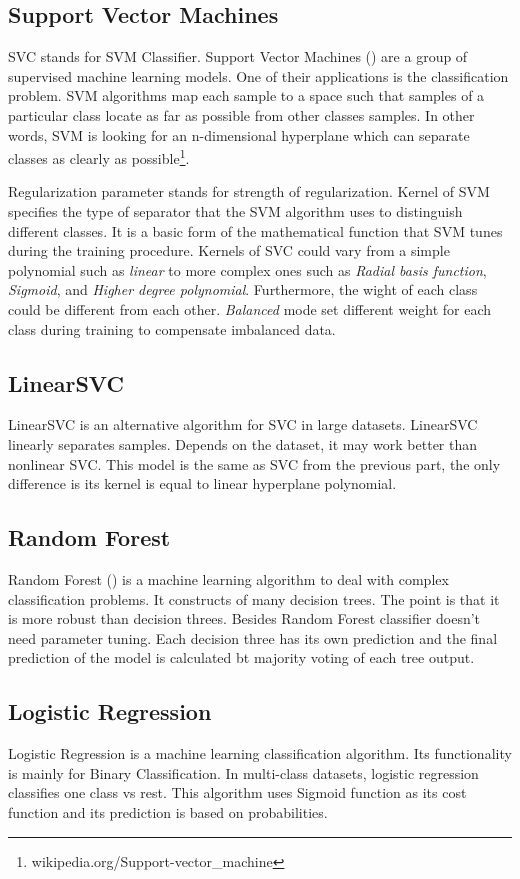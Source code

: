 \subsection{Support Vector Machines}
\label{SVM}
SVC stands for SVM Classifier. Support Vector Machines (\cite{svc})  are a group of supervised machine learning models. One of their applications is the classification problem. SVM algorithms map each sample to a space such that samples of a particular class locate as far as possible from other classes samples. In other words, SVM is looking for an n-dimensional hyperplane which can separate classes as clearly as possible\footnote{wikipedia.org/Support-vector\_machine}.

Regularization parameter stands for strength of regularization. Kernel of SVM specifies the type of separator that the SVM algorithm uses to distinguish different classes. It is a basic form of the mathematical function that SVM tunes during the training procedure. Kernels of SVC could vary from a simple polynomial such as \textit{linear} to more complex ones such as \textit{Radial basis function}, \textit{Sigmoid}, and \textit{Higher degree polynomial}. Furthermore, the wight of each class could be different from each other. \textit{Balanced} mode set different weight for each class during training to compensate imbalanced data. 


\subsection{LinearSVC}
LinearSVC is an alternative algorithm for SVC in large datasets. LinearSVC linearly separates samples. Depends on the dataset, it may work better than nonlinear SVC. This model is the same as SVC from the previous part, the only difference is its kernel is equal to linear hyperplane polynomial. 

\subsection{Random Forest}
Random Forest (\cite{randomforest}) is a machine learning algorithm to deal with complex classification problems. It constructs of many decision trees. The point is that it is more robust than decision threes. Besides Random Forest classifier doesn't need parameter tuning. Each decision three has its own prediction and the final prediction of the model is calculated bt majority voting of each tree output. 

\subsection{Logistic Regression}
Logistic Regression is a machine learning classification algorithm. Its functionality is mainly for Binary Classification. In multi-class datasets, logistic regression classifies one class vs rest. This algorithm uses Sigmoid function as its cost function and its prediction is based on probabilities. 

